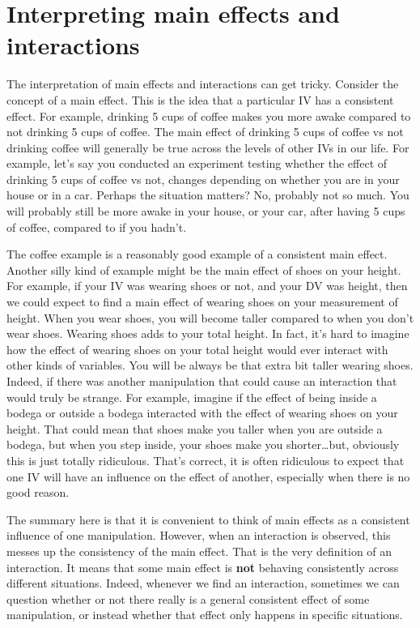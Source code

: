 \documentclass[]{book}
\begin{document}
\hypertarget{interpreting-main-effects-and-interactions}{%
\section{Interpreting main effects and interactions}\label{interpreting-main-effects-and-interactions}}

The interpretation of main effects and interactions can get tricky. Consider the concept of a main effect. This is the idea that a particular IV has a consistent effect. For example, drinking 5 cups of coffee makes you more awake compared to not drinking 5 cups of coffee. The main effect of drinking 5 cups of coffee vs not drinking coffee will generally be true across the levels of other IVs in our life. For example, let's say you conducted an experiment testing whether the effect of drinking 5 cups of coffee vs not, changes depending on whether you are in your house or in a car. Perhaps the situation matters? No, probably not so much. You will probably still be more awake in your house, or your car, after having 5 cups of coffee, compared to if you hadn't.

The coffee example is a reasonably good example of a consistent main effect. Another silly kind of example might be the main effect of shoes on your height. For example, if your IV was wearing shoes or not, and your DV was height, then we could expect to find a main effect of wearing shoes on your measurement of height. When you wear shoes, you will become taller compared to when you don't wear shoes. Wearing shoes adds to your total height. In fact, it's hard to imagine how the effect of wearing shoes on your total height would ever interact with other kinds of variables. You will be always be that extra bit taller wearing shoes. Indeed, if there was another manipulation that could cause an interaction that would truly be strange. For example, imagine if the effect of being inside a bodega or outside a bodega interacted with the effect of wearing shoes on your height. That could mean that shoes make you taller when you are outside a bodega, but when you step inside, your shoes make you shorter\ldots{}but, obviously this is just totally ridiculous. That's correct, it is often ridiculous to expect that one IV will have an influence on the effect of another, especially when there is no good reason.

The summary here is that it is convenient to think of main effects as a consistent influence of one manipulation. However, when an interaction is observed, this messes up the consistency of the main effect. That is the very definition of an interaction. It means that some main effect is \textbf{not} behaving consistently across different situations. Indeed, whenever we find an interaction, sometimes we can question whether or not there really is a general consistent effect of some manipulation, or instead whether that effect only happens in specific situations.
\end{document}
